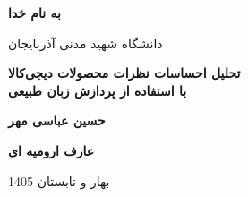 \begin{titlepage}
	
	\centering
	
	\vspace*{1cm}
	
	{\fontsize{24pt}{30pt}\selectfont\textbf{به نام خدا}}
	
	\vspace{2cm}
	
	{\fontsize{18pt}{26pt}\selectfont{پروژه کارشناسی علوم کامپیوتر}}
	
	\vspace{0.5cm}
	
	{\fontsize{16pt}{24pt}\selectfont دانشگاه شهید مدنی آذربایجان}
	
	\vspace{2cm}
	
	{\fontsize{16pt}{24pt}\selectfont{موضوع}}
	
	\vspace{0.2cm}
	
	{\fontsize{20pt}{28pt}\selectfont\textbf{
			تحلیل احساسات نظرات محصولات دیجی‌کالا\\[0.4cm]
			با استفاده از پردازش زبان طبیعی
	}}
	
	\vfill
	
	{\fontsize{16pt}{24pt}\selectfont{استاد راهنما}}
	
	\vspace{0.2cm}
	
	{\fontsize{18pt}{24pt}\selectfont \textbf {حسین عباسی مهر}}
	
	\vfill
	
	{\fontsize{16pt}{24pt}\selectfont{دانشجو}}
	
	\vspace{0.2cm}
	
	{\fontsize{18pt}{24pt}\selectfont \textbf {عارف ارومیه ای}}
	
	\vspace{2cm}
	
	{\fontsize{14pt}{24pt}\selectfont بهار و تابستان 1405}
	
\end{titlepage}